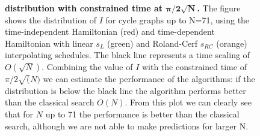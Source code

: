 
\begin{figure}[ht]
  \centering
  \caption[$I$ distribution for Cy(N) up to N=71 with constrained time at $\pi/2\sqrt(N)$.]{\textbf{ distribution with constrained time at $\bm{\pi/2\sqrt{N}}$.} The figure shows the distribution of $I$ for cycle graphs up to N=71, using the time-independent Hamiltonian (red) and time-dependent Hamiltonian with linear $s_L$ (green) and Roland-Cerf $s_{RC}$ (orange) interpolating schedules. The black line represents a time scaling of $O(\sqrt{N})$. Combining the value of $I$ with the constrained time of $\pi/2\sqrt(N)$ we can estimate the performance of the algorithms: if the distribution is below the black line the algorithm performs better than the classical search $O(N)$. From this plot we can clearly see that for $N$ up to 71 the performance is better than the classical search, although we are not able to make predictions for larger N.}
  \label{fig:delta_increasing_time}
\end{figure}
